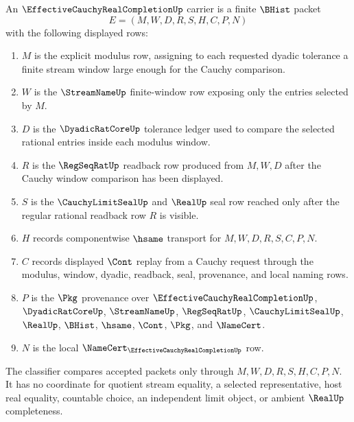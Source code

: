 \begin{definition}
\label{def:effective-cauchy-real-completion-carrier}
An $\EffectiveCauchyRealCompletionUp$ carrier is a finite $\BHist$ packet
$$
E=(M,W,D,R,S,H,C,P,N)
$$
with the following displayed rows:
\begin{enumerate}
\item $M$ is the explicit modulus row, assigning to each requested dyadic tolerance a finite stream window large enough for the Cauchy comparison.
\item $W$ is the $\StreamNameUp$ finite-window row exposing only the entries selected by $M$.
\item $D$ is the $\DyadicRatCoreUp$ tolerance ledger used to compare the selected rational entries inside each modulus window.
\item $R$ is the $\RegSeqRatUp$ readback row produced from $M,W,D$ after the Cauchy window comparison has been displayed.
\item $S$ is the $\CauchyLimitSealUp$ and $\RealUp$ seal row reached only after the regular rational readback row $R$ is visible.
\item $H$ records componentwise $\hsame$ transport for $M,W,D,R,S,C,P,N$.
\item $C$ records displayed $\Cont$ replay from a Cauchy request through the modulus, window, dyadic, readback, seal, provenance, and local naming rows.
\item $P$ is the $\Pkg$ provenance over $\EffectiveCauchyRealCompletionUp$, $\DyadicRatCoreUp$, $\StreamNameUp$, $\RegSeqRatUp$, $\CauchyLimitSealUp$, $\RealUp$, $\BHist$, $\hsame$, $\Cont$, $\Pkg$, and $\NameCert$.
\item $N$ is the local $\NameCert_{\EffectiveCauchyRealCompletionUp}$ row.
\end{enumerate}
The classifier compares accepted packets only through $M,W,D,R,S,H,C,P,N$. It has no coordinate for quotient stream equality, a selected representative, host real equality, countable choice, an independent limit object, or ambient $\RealUp$ completeness.
\end{definition}


